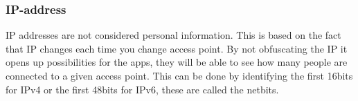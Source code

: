 \subsubsection*{IP-address}
IP addresses are not considered personal information. This is based on the fact that IP changes each time you change access point. By not obfuscating the IP it opens up possibilities for the apps, they will be able to see how many people are connected to a given access point. This can be done by identifying the first 16bits for IPv4 or the first 48bits for IPv6, these are called the netbits\cite{IPnetworkID}.